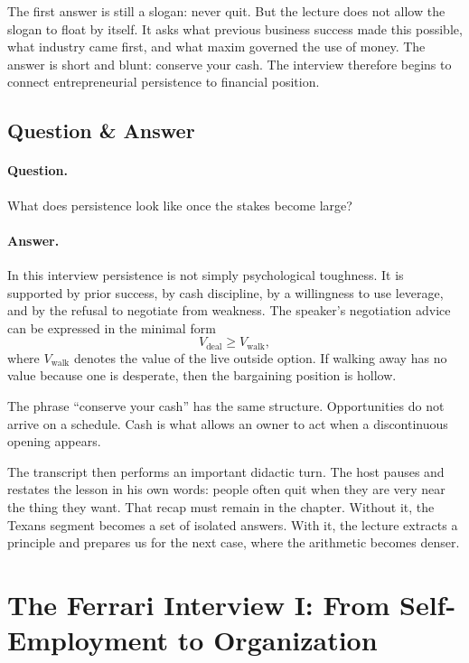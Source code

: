 The first answer is still a slogan: never quit. But the lecture does not allow the slogan to float by itself. It asks what previous business success made this possible, what industry came first, and what maxim governed the use of money. The answer is short and blunt: conserve your cash. The interview therefore begins to connect entrepreneurial persistence to financial position.

\subsection{Question \& Answer}

\paragraph{Question.} What does persistence look like once the stakes become large?

\paragraph{Answer.} In this interview persistence is not simply psychological toughness. It is supported by prior success, by cash discipline, by a willingness to use leverage, and by the refusal to negotiate from weakness. The speaker's negotiation advice can be expressed in the minimal form
\begin{equation}
V_{\text{deal}} \geq V_{\text{walk}},
\end{equation}
where \(V_{\text{walk}}\) denotes the value of the live outside option. If walking away has no value because one is desperate, then the bargaining position is hollow.

\begin{remark}
The phrase ``conserve your cash'' has the same structure. Opportunities do not arrive on a schedule. Cash is what allows an owner to act when a discontinuous opening appears.
\end{remark}

The transcript then performs an important didactic turn. The host pauses and restates the lesson in his own words: people often quit when they are very near the thing they want. That recap must remain in the chapter. Without it, the Texans segment becomes a set of isolated answers. With it, the lecture extracts a principle and prepares us for the next case, where the arithmetic becomes denser.

\section{The Ferrari Interview I: From Self-Employment to Organization}

